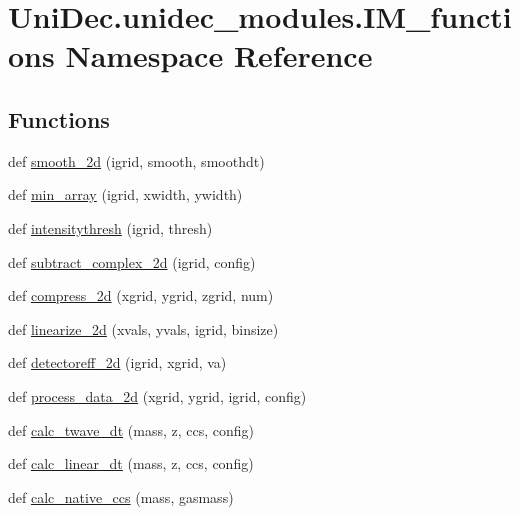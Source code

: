 \hypertarget{namespace_uni_dec_1_1unidec__modules_1_1_i_m__functions}{}\section{Uni\+Dec.\+unidec\+\_\+modules.\+I\+M\+\_\+functions Namespace Reference}
\label{namespace_uni_dec_1_1unidec__modules_1_1_i_m__functions}
\subsection*{Functions}
\begin{DoxyCompactItemize}
\item 
def \hyperlink{namespace_uni_dec_1_1unidec__modules_1_1_i_m__functions_a647c252cc5c54674e66a9a35855603f7}{smooth\+\_\+2d} (igrid, smooth, smoothdt)
\item 
def \hyperlink{namespace_uni_dec_1_1unidec__modules_1_1_i_m__functions_a2bec3500904e16600d07773a322d15f7}{min\+\_\+array} (igrid, xwidth, ywidth)
\item 
def \hyperlink{namespace_uni_dec_1_1unidec__modules_1_1_i_m__functions_ae378dee414a93ecd80c14f8f39a85602}{intensitythresh} (igrid, thresh)
\item 
def \hyperlink{namespace_uni_dec_1_1unidec__modules_1_1_i_m__functions_acd6eaa7e6a91227ba450a315f30767d4}{subtract\+\_\+complex\+\_\+2d} (igrid, config)
\item 
def \hyperlink{namespace_uni_dec_1_1unidec__modules_1_1_i_m__functions_abd3fa830e3fabb0ade11fa94040d6261}{compress\+\_\+2d} (xgrid, ygrid, zgrid, num)
\item 
def \hyperlink{namespace_uni_dec_1_1unidec__modules_1_1_i_m__functions_a9fbc0d46d22e363eef9489a505d7de6b}{linearize\+\_\+2d} (xvals, yvals, igrid, binsize)
\item 
def \hyperlink{namespace_uni_dec_1_1unidec__modules_1_1_i_m__functions_a3ee8c9aac2bc952cf0f7e6aef3184754}{detectoreff\+\_\+2d} (igrid, xgrid, va)
\item 
def \hyperlink{namespace_uni_dec_1_1unidec__modules_1_1_i_m__functions_a1ae0d69acb8dbada964f301a111c6eac}{process\+\_\+data\+\_\+2d} (xgrid, ygrid, igrid, config)
\item 
def \hyperlink{namespace_uni_dec_1_1unidec__modules_1_1_i_m__functions_af7491ae6fb976956b24daf285328a496}{calc\+\_\+twave\+\_\+dt} (mass, z, ccs, config)
\item 
def \hyperlink{namespace_uni_dec_1_1unidec__modules_1_1_i_m__functions_a83d8acfa182a7341a31567d5ab42a458}{calc\+\_\+linear\+\_\+dt} (mass, z, ccs, config)
\item 
def \hyperlink{namespace_uni_dec_1_1unidec__modules_1_1_i_m__functions_ac4398d0f6c884010d1053bf39e01f79a}{calc\+\_\+native\+\_\+ccs} (mass, gasmass)
\end{DoxyCompactItemize}
